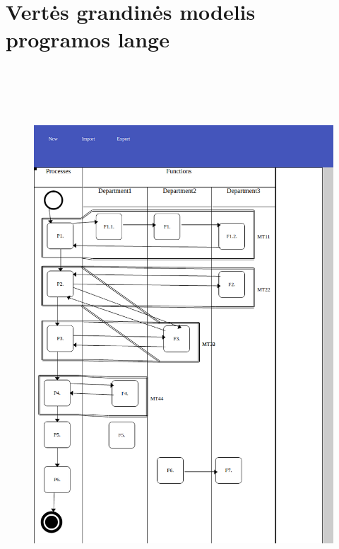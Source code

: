 \documentclass{VUMIFInfBakalaurinis}
\begin{document}
\appendix  %

\section{Vertės grandinės modelis programos lange} \label{appendix:dvcm_window}
\begin{figure}[H]
    \centering
    \includegraphics[height=20cm]{img/dvcm_window}
\end{figure}
\end{document}
